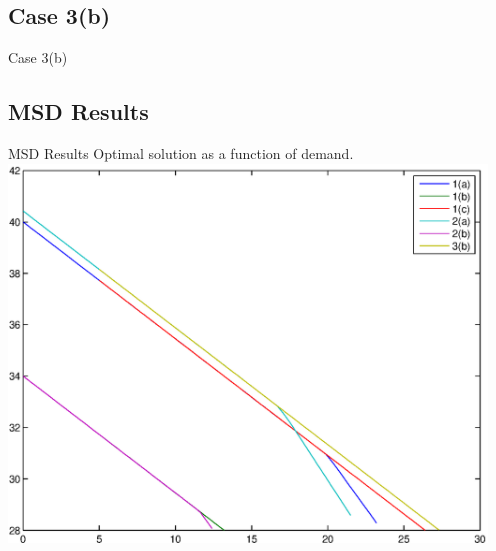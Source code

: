 \documentclass[xcolor=x11names,compress]{beamer}
\renewcommand{\(}{\begin{columns}}
\renewcommand{\)}{\end{columns}}
\newcommand{\<}[1]{\begin{column}{#1}}
\renewcommand{\>}{\end{column}}
\begin{document}
\subsection{Case 3(b)}
\begin{frame}{Case 3(b)}

\begin{figure}[!ht]
\centering
{}
\end{figure}

\end{frame}

\subsection{MSD Results}
\begin{frame}{MSD Results}
Optimal solution as a function of demand.
\includegraphics[width=5in]{../optimize/figs/allzvd.eps}
\end{frame}
\end{document}
